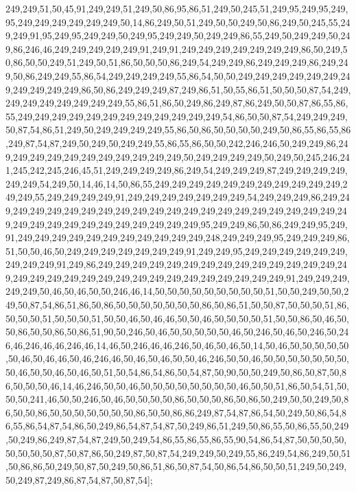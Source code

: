 249,249,51,50,45,91,249,249,51,249,50,86,95,86,51,249,50,245,51,249,95,249,95,249,95,249,249,249,249,249,249,50,14,86,249,50,51,249,50,50,249,50,86,249,50,245,55,249,249,91,95,249,95,249,249,50,249,95,249,249,50,249,249,86,55,249,50,249,249,50,249,86,246,46,249,249,249,249,249,91,249,91,249,249,249,249,249,249,249,86,50,249,50,86,50,50,249,51,249,50,51,86,50,50,50,86,249,54,249,249,86,249,249,249,86,249,249,50,86,249,249,55,86,54,249,249,249,249,55,86,54,50,50,249,249,249,249,249,249,249,249,249,249,249,86,50,86,249,249,249,87,249,86,51,50,55,86,51,50,50,50,87,54,249,249,249,249,249,249,249,249,55,86,51,86,50,249,86,249,87,86,249,50,50,87,86,55,86,55,249,249,249,249,249,249,249,249,249,249,249,249,54,86,50,50,87,54,249,249,249,50,87,54,86,51,249,50,249,249,249,249,55,86,50,86,50,50,50,50,249,50,86,55,86,55,86,249,87,54,87,249,50,249,50,249,249,55,86,55,86,50,50,242,246,246,50,249,249,86,249,249,249,249,249,249,249,249,249,249,249,50,249,249,249,249,50,249,50,245,246,241,245,242,245,246,45,51,249,249,249,249,86,249,54,249,249,249,87,249,249,249,249,249,249,54,249,50,14,46,14,50,86,55,249,249,249,249,249,249,249,249,249,249,249,249,249,55,249,249,249,249,91,249,249,249,249,249,249,249,54,249,249,249,86,249,249,249,249,249,249,249,249,249,249,249,249,249,249,249,249,249,249,249,249,249,249,249,249,249,249,249,249,249,249,249,249,249,95,249,249,86,50,86,249,249,95,249,91,249,249,249,249,249,249,249,249,249,249,249,248,249,249,249,95,249,249,249,86,51,50,50,46,50,249,249,249,249,249,249,249,91,249,249,95,249,249,249,249,249,249,249,249,249,91,249,86,249,249,249,249,249,249,249,249,249,249,249,249,249,249,249,249,249,249,249,249,249,249,249,249,249,249,249,249,249,249,249,91,249,249,249,249,249,50,46,50,46,50,50,246,46,14,50,50,50,50,50,50,50,50,50,51,50,50,249,50,50,249,50,87,54,86,51,86,50,86,50,50,50,50,50,50,50,86,50,86,51,50,50,87,50,50,50,51,86,50,50,50,51,50,50,50,51,50,50,46,50,46,46,50,50,46,50,50,50,50,51,50,50,86,50,46,50,50,86,50,50,86,50,86,51,90,50,246,50,46,50,50,50,50,50,46,50,246,50,46,50,246,50,246,46,246,46,46,246,46,14,46,50,246,46,46,246,50,46,50,46,50,14,50,46,50,50,50,50,50,50,46,50,46,46,50,46,246,46,50,46,50,46,50,50,46,246,50,50,46,50,50,50,50,50,50,50,50,46,50,50,46,50,46,50,51,50,54,86,54,86,50,54,87,50,90,50,50,249,50,86,50,87,50,86,50,50,50,46,14,46,246,50,50,46,50,50,50,50,50,50,50,50,46,50,50,51,86,50,54,51,50,50,50,241,46,50,50,246,50,46,50,50,50,50,86,50,50,50,86,50,86,50,249,50,50,249,50,86,50,50,86,50,50,50,50,50,50,50,86,50,50,86,86,249,87,54,87,86,54,50,249,50,86,54,86,55,86,54,87,54,86,50,249,86,54,87,54,87,50,249,86,51,249,50,86,55,50,86,55,50,249,50,249,86,249,87,54,87,249,50,249,54,86,55,86,55,86,55,90,54,86,54,87,50,50,50,50,50,50,50,50,87,50,87,86,50,249,87,50,87,54,249,249,50,249,55,86,249,54,86,249,50,51,50,86,86,50,249,50,87,50,249,50,86,51,86,50,87,54,50,86,54,86,50,50,51,249,50,249,50,249,87,249,86,87,54,87,50,87,54];

